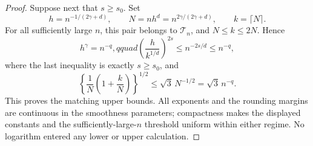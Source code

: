 \documentclass{article}
\begin{document}
\begin{proof}
Suppose next that \(s\geq s_0\).  Set
\[
 h=n^{-1/(2\gamma+d)},\qquad N=nh^d=n^{2\gamma/(2\gamma+d)},\qquad k=\lceil N\rceil.
\]
For all sufficiently large \(n\), this pair belongs to \(\mathcal T_n\), and \(N\leq k\leq2N\).  Hence
\[
 h^\gamma=n^{-q},qquad
 \left(\frac{h}{k^{1/d}}\right)^{2s}\leq n^{-2s/d}\leq n^{-q},
\]
where the last inequality is exactly \(s\geq s_0\), and
\[
 \left\{\frac1N\left(1+\frac{k}{N}\right)\right\}^{1/2}
 \leq\sqrt{3}\,N^{-1/2}=\sqrt3\,n^{-q}.
\]
This proves the matching upper bounds.  All exponents and the rounding margins are continuous in the smoothness parameters; compactness makes the displayed constants and the sufficiently-large-\(n\) threshold uniform within either regime.  No logarithm entered any lower or upper calculation.
\end{proof}
\end{document}
